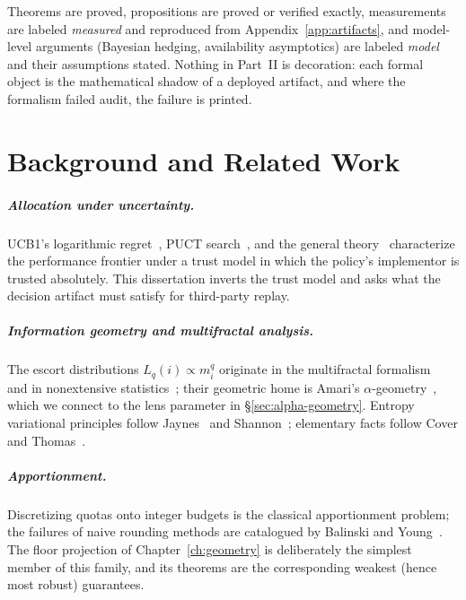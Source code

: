 \documentclass[12pt,oneside]{report}
\theoremstyle{plain}
\theoremstyle{definition}
\theoremstyle{remark}
\newcommand{\escort}[1]{L_{#1}}
\begin{document}
Theorems are proved, propositions are proved or verified exactly,
measurements are labeled \emph{measured} and reproduced from
Appendix~\ref{app:artifacts}, and model-level arguments (Bayesian
hedging, availability asymptotics) are labeled \emph{model} and their
assumptions stated. Nothing in Part~II is decoration: each formal object
is the mathematical shadow of a deployed artifact, and where the
formalism failed audit, the failure is printed.

\chapter{Background and Related Work}
\label{ch:background}

\paragraph{Allocation under uncertainty.}
UCB1's logarithmic regret~\cite{auer2002}, PUCT search~\cite{rosin2011},
and the general theory~\cite{sutton2018} characterize the performance
frontier under a trust model in which the policy's implementor is
trusted absolutely. This dissertation inverts the trust model and asks
what the decision artifact must satisfy for third-party replay.

\paragraph{Information geometry and multifractal analysis.}
The escort distributions $\escort{q}(i) \propto m_i^q$ originate in the
multifractal formalism~\cite{halsey1986,renyi1970} and in nonextensive
statistics~\cite{tsallis1988}; their geometric home is Amari's
$\alpha$-geometry~\cite{amari2000}, which we connect to the lens
parameter in \S\ref{sec:alpha-geometry}. Entropy variational principles
follow Jaynes~\cite{jaynes1957} and Shannon~\cite{shannon1948};
elementary facts follow Cover and Thomas~\cite{cover2006}.

\paragraph{Apportionment.}
Discretizing quotas onto integer budgets is the classical
apportionment problem; the failures of naive rounding methods are
catalogued by Balinski and Young~\cite{balinski1982}. The floor
projection of Chapter~\ref{ch:geometry} is deliberately the simplest
member of this family, and its theorems are the corresponding weakest
(hence most robust) guarantees.
\end{document}

